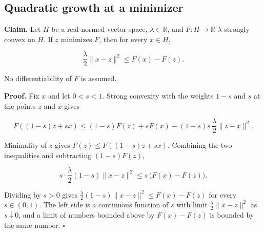 \documentclass[11pt,a4paper]{report}
\begin{document}
\subsection{\texorpdfstring{Quadratic growth at a minimizer}{Quadratic growth at a minimizer}}


\textbf{Claim.} Let \(H\) be a real normed vector space, \(\lambda\in\mathbb R\), and \(F:H\to\mathbb R\) \(\lambda\)-strongly convex on \(H\). If \(z\) minimizes \(F\), then for every \(x\in H\),


\[\frac\lambda2\|x-z\|^2\le F(x)-F(z).\]


No differentiability of \(F\) is assumed.




\textbf{Proof.} Fix \(x\) and let \(0<s<1\). Strong convexity with the weights \(1-s\) and \(s\) at the points \(z\) and \(x\) gives


\[F((1-s)z+sx)\le(1-s)F(z)+sF(x)-(1-s)s\,\frac\lambda2\|z-x\|^2.\]


Minimality of \(z\) gives \(F(z)\le F((1-s)z+sx)\). Combining the two inequalities and subtracting \((1-s)F(z)\),


\[s\cdot\frac\lambda2(1-s)\|x-z\|^2\le s\,\bigl(F(x)-F(z)\bigr).\]


Dividing by \(s>0\) gives \(\frac\lambda2(1-s)\|x-z\|^2\le F(x)-F(z)\) for every \(s\in(0,1)\). The left side is a continuous function of \(s\) with limit \(\frac\lambda2\|x-z\|^2\) as \(s\downarrow0\), and a limit of numbers bounded above by \(F(x)-F(z)\) is bounded by the same number. \(\square\)
\end{document}
